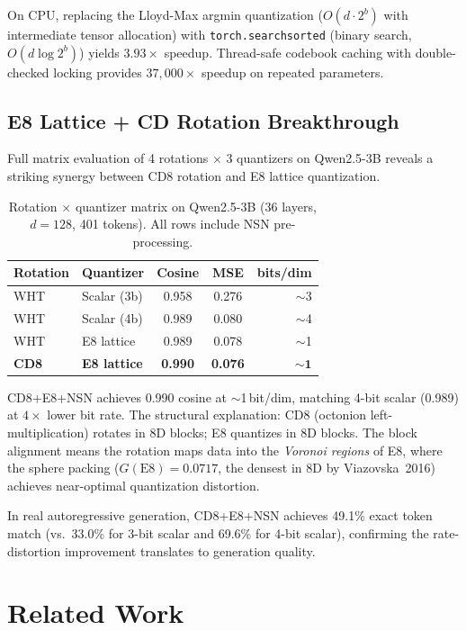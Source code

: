 \documentclass[sigconf,anonymous,review]{acmart}
\begin{document}
On CPU, replacing the Lloyd-Max argmin quantization
($O(d \cdot 2^b)$ with intermediate tensor allocation) with
\texttt{torch.searchsorted} (binary search, $O(d \log 2^b)$)
yields $3.93\times$ speedup. Thread-safe codebook caching with
double-checked locking provides $37{,}000\times$ speedup on
repeated parameters.

\subsection{E8 Lattice + CD Rotation Breakthrough}

Full matrix evaluation of 4 rotations $\times$ 3 quantizers on Qwen2.5-3B
reveals a striking synergy between CD8 rotation and E8 lattice quantization.

\begin{table}[t]
\centering
\caption{Rotation $\times$ quantizer matrix on Qwen2.5-3B (36 layers,
$d=128$, 401 tokens). All rows include NSN pre-processing.}
\label{tab:e8breakthrough}
\begin{tabular}{llccr}
\toprule
Rotation & Quantizer & Cosine & MSE & bits/dim \\
\midrule
WHT & Scalar (3b) & 0.958 & 0.276 & $\sim$3 \\
WHT & Scalar (4b) & 0.989 & 0.080 & $\sim$4 \\
WHT & E8 lattice & 0.989 & 0.078 & $\sim$1 \\
\textbf{CD8} & \textbf{E8 lattice} & \textbf{0.990} & \textbf{0.076} & $\mathbf{\sim 1}$ \\
\bottomrule
\end{tabular}
\end{table}

CD8+E8+NSN achieves 0.990 cosine at $\sim$1\,bit/dim, matching 4-bit
scalar (0.989) at $4\times$ lower bit rate. The structural explanation:
CD8 (octonion left-multiplication) rotates in 8D blocks; E8 quantizes
in 8D blocks. The block alignment means the rotation maps data into
the \emph{Voronoi regions} of E8, where the sphere packing
($G(\text{E8}) = 0.0717$, the densest in 8D by Viazovska~2016)
achieves near-optimal quantization distortion.

In real autoregressive generation, CD8+E8+NSN achieves 49.1\% exact
token match (vs.\ 33.0\% for 3-bit scalar and 69.6\% for 4-bit scalar),
confirming the rate-distortion improvement translates to generation quality.

\section{Related Work}
\label{sec:related}
\end{document}
